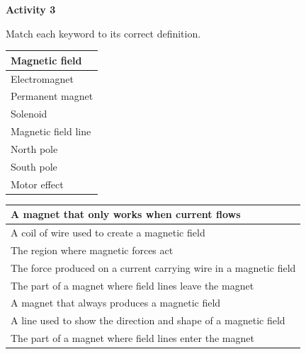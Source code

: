 \documentclass[12pt]{article}
\begin{document}
\begin{center}
\end{center}

\newpage

\textbf{Activity 3}

Match each keyword to its correct definition.

\vspace{1em}

\begin{minipage}{0.4\textwidth}
\begin{tabular}{|p{6cm}|}
\hline
Magnetic field \\ \hline
Electromagnet \\ \hline
Permanent magnet \\ \hline
Solenoid \\ \hline
Magnetic field line \\ \hline
North pole \\ \hline
South pole \\ \hline
Motor effect \\ \hline
\end{tabular}
\end{minipage}
\hfill
\begin{minipage}{0.45\textwidth}
\begin{tabular}{|p{7cm}|}
\hline
A magnet that only works when current flows \\ \hline
A coil of wire used to create a magnetic field \\ \hline
The region where magnetic forces act \\ \hline
The force produced on a current carrying wire in a magnetic field \\ \hline
The part of a magnet where field lines leave the magnet \\ \hline
A magnet that always produces a magnetic field \\ \hline
A line used to show the direction and shape of a magnetic field \\ \hline
The part of a magnet where field lines enter the magnet \\ \hline
\end{tabular}
\end{minipage}
\end{document}

